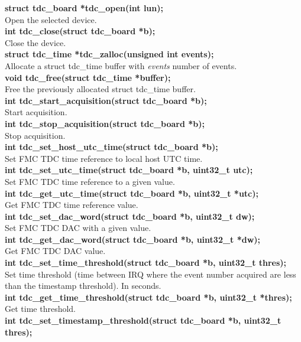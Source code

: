 \documentclass[a4paper,11pt]{article}
\begin{document}
\textbf{struct tdc\_board *tdc\_open(int lun);} \\
Open the selected device.\\
\textbf{int tdc\_close(struct tdc\_board *b);}  \\
Close the device. \\
\textbf{struct tdc\_time *tdc\_zalloc(unsigned int events);} \\
Allocate a struct tdc\_time buffer with \textit{events} number of events. \\
\textbf{void tdc\_free(struct tdc\_time *buffer);} \\
Free the previously allocated struct tdc\_time buffer. \\
\textbf{int tdc\_start\_acquisition(struct tdc\_board *b);} \\
Start acquisition.\\
\textbf{int tdc\_stop\_acquisition(struct tdc\_board *b);} \\
Stop acquisition.\\
\textbf{int tdc\_set\_host\_utc\_time(struct tdc\_board *b);} \\
Set FMC TDC time reference to local host UTC time. \\
\textbf{int tdc\_set\_utc\_time(struct tdc\_board *b, uint32\_t utc);} \\
Set FMC TDC time reference to a given value.\\
\textbf{int tdc\_get\_utc\_time(struct tdc\_board *b, uint32\_t *utc);} \\
Get FMC TDC time reference value. \\
\textbf{int tdc\_set\_dac\_word(struct tdc\_board *b, uint32\_t dw);} \\
Set FMC TDC DAC with a given value. \\
\textbf{int tdc\_get\_dac\_word(struct tdc\_board *b, uint32\_t *dw);} \\
Get FMC TDC DAC value. \\
\textbf{int tdc\_set\_time\_threshold(struct tdc\_board *b, uint32\_t thres);} \\
Set time threshold (time between IRQ where the event number acquired are less than the timestamp
threshold). In seconds. \\
\textbf{int tdc\_get\_time\_threshold(struct tdc\_board *b, uint32\_t *thres);} \\
Get time threshold. \\
\textbf{int tdc\_set\_timestamp\_threshold(struct tdc\_board *b, uint32\_t thres);} \\
\end{document}
